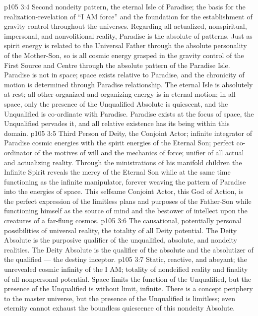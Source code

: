 \vs p105 3:4 \bibnobreakspace {} Second nondeity pattern, the eternal Isle of Paradise; the basis for the realization\hyp{}revelation of “I AM force” and the foundation for the establishment of gravity control throughout the universes. Regarding all actualized, nonspiritual, impersonal, and nonvolitional reality, Paradise is the absolute of patterns. Just as spirit energy is related to the Universal Father through the absolute personality of the Mother\hyp{}Son, so is all cosmic energy grasped in the gravity control of the First Source and Centre through the absolute pattern of the Paradise Isle. Paradise is not in space; space exists relative to Paradise, and the chronicity of motion is determined through Paradise relationship. The eternal Isle is absolutely at rest; all other organized and organizing energy is in eternal motion; in all space, only the presence of the Unqualified Absolute is quiescent, and the Unqualified is co\hyp{}ordinate with Paradise. Paradise exists at the focus of space, the Unqualified pervades it, and all relative existence has its being within this domain.
\vs p105 3:5 \bibnobreakspace {} Third Person of Deity, the Conjoint Actor; infinite integrator of Paradise cosmic energies with the spirit energies of the Eternal Son; perfect co\hyp{}ordinator of the motives of will and the mechanics of force; unifier of all actual and actualizing reality. Through the ministrations of his manifold children the Infinite Spirit reveals the mercy of the Eternal Son while at the same time functioning as the infinite manipulator, forever weaving the pattern of Paradise into the energies of space. This selfsame Conjoint Actor, this God of Action, is the perfect expression of the limitless plans and purposes of the Father\hyp{}Son while functioning himself as the source of mind and the bestower of intellect upon the creatures of a far\hyp{}flung cosmos.
\vs p105 3:6 \bibnobreakspace {} The causational, potentially personal possibilities of universal reality, the totality of all Deity potential. The Deity Absolute is the purposive qualifier of the unqualified, absolute, and nondeity realities. The Deity Absolute is the qualifier of the absolute and the absolutizer of the qualified --- the destiny inceptor.
\vs p105 3:7 \bibnobreakspace {} Static, reactive, and abeyant; the unrevealed cosmic infinity of the I AM; totality of nondeified reality and finality of all nonpersonal potential. Space limits the function of the Unqualified, but the presence of the Unqualified is without limit, infinite. There is a concept periphery to the master universe, but the presence of the Unqualified is limitless; even eternity cannot exhaust the boundless quiescence of this nondeity Absolute.
